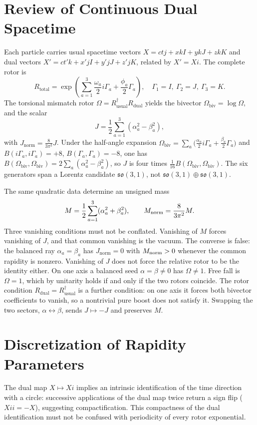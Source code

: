 \documentclass[a4paper]{article}
\theoremstyle{definition}
\newcommand{\Jnorm}{J_{\mathrm{norm}}}
\newcommand{\Mnorm}{M_{\rm norm}}
\begin{document}
\section{Review of Continuous Dual Spacetime}
\label{sec:review}

Each particle carries usual spacetime vectors $X = ct j + x kI + y kJ + z kK$ and dual vectors $X' = ct' k + x' jI + y' jJ + z' jK$, related by $X' = Xi$. The complete rotor is
\[
R_\text{total} = \exp\left( \sum_{a=1}^3 \frac{\omega_a}{2} i\Gamma_a + \frac{\phi_a}{2} \Gamma_a \right), \quad \Gamma_1 = I,\ \Gamma_2 = J,\ \Gamma_3 = K.
\]
The torsional mismatch rotor $\Omega = R_\text{usual}^\dagger R_\text{dual}$ yields the bivector $\Omega_\text{biv} = \log \Omega$, and the scalar
\[
J = \frac12\sum_{a=1}^3(\alpha_a^2-\beta_a^2),
\]
with $\Jnorm=\frac8{3\pi^2}J$. Under the half-angle expansion $\Omega_\text{biv}=\sum_a\bigl(\frac{\alpha_a}{2}i\Gamma_a+\frac{\beta_a}{2}\Gamma_a\bigr)$ and $B(i\Gamma_a,i\Gamma_a)=+8$, $B(\Gamma_a,\Gamma_a)=-8$, one has $B(\Omega_\text{biv},\Omega_\text{biv})=2\sum_a(\alpha_a^2-\beta_a^2)$, so $J$ is four times $\frac1{16}B(\Omega_\text{biv},\Omega_\text{biv})$. The six generators span a Lorentz candidate $\mathfrak{so}(3,1)$, not $\mathfrak{so}(3,1)\oplus\mathfrak{so}(3,1)$.

The same quadratic data determine an unsigned mass
\[
M = \frac12\sum_{a=1}^3(\alpha_a^2+\beta_a^2),\qquad \Mnorm=\frac8{3\pi^2}M.
\]
Three vanishing conditions must not be conflated. Vanishing of $M$ forces vanishing of $J$, and that common vanishing is the vacuum. The converse is false: the balanced ray $\alpha_a=\beta_a$ has $\Jnorm=0$ with $\Mnorm>0$ whenever the common rapidity is nonzero. Vanishing of $J$ does not force the relative rotor to be the identity either. On one axis a balanced seed $\alpha=\beta\neq 0$ has $\Omega\neq 1$. Free fall is $\Omega=1$, which by unitarity holds if and only if the two rotors coincide. The rotor condition $R_{\mathrm{dual}}=R_{\mathrm{usual}}^\dagger$ is a further condition: on one axis it forces both bivector coefficients to vanish, so a nontrivial pure boost does not satisfy it. Swapping the two sectors, $\alpha\leftrightarrow\beta$, sends $J\mapsto -J$ and preserves $M$.

\section{Discretization of Rapidity Parameters}
\label{sec:discretization}

The dual map $X \mapsto Xi$ implies an intrinsic identification of the time direction with a circle: successive applications of the dual map twice return a sign flip ($Xi i = -X$), suggesting compactification. This compactness of the dual identification must not be confused with periodicity of every rotor exponential.
\end{document}
